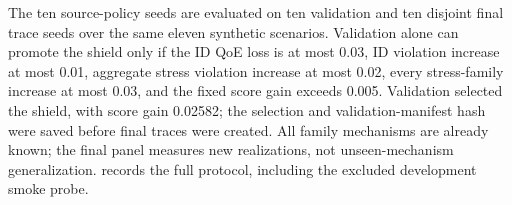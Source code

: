 \documentclass[10pt]{article}
\providecommand{\shieldpath}{generated-shield}
\begin{document}
The ten source-policy seeds are evaluated on ten validation and ten disjoint final trace seeds over the same eleven synthetic scenarios. Validation alone can promote the shield only if the ID QoE loss is at most 0.03, ID violation increase at most 0.01, aggregate stress violation increase at most 0.02, every stress-family increase at most 0.03, and the fixed score gain exceeds 0.005. Validation selected the shield, with score gain 0.02582; the selection and validation-manifest hash were saved before final traces were created. All family mechanisms are already known; the final panel measures new realizations, not unseen-mechanism generalization.  records the full protocol, including the excluded development smoke probe.

\begin{table}[t]
\centering\resizebox{\textwidth}{!}{}
\caption{V5 validation metrics and locked promotion decision. The candidate must satisfy all QoE and aggregate/family risk bounds and exceed the prespecified selection-score margin.}
\label{tab:shield-selection}
\end{table}

\begin{table}[t]
\centering\resizebox{\textwidth}{!}{}
\caption{V5 validation stress-family violation differences (shield minus v1); increases are compared with the 3-percentage-point bound.}
\label{tab:shield-families}
\end{table}
\end{document}
